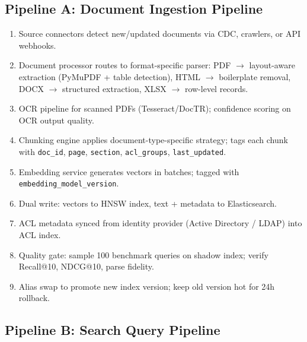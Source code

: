 \subsection*{Pipeline A: Document Ingestion Pipeline}

\begin{enumerate}
  \item Source connectors detect new/updated documents via CDC, crawlers, or API webhooks.
  \item Document processor routes to format-specific parser: PDF $\rightarrow$ layout-aware extraction (PyMuPDF + table detection), HTML $\rightarrow$ boilerplate removal, DOCX $\rightarrow$ structured extraction, XLSX $\rightarrow$ row-level records.
  \item OCR pipeline for scanned PDFs (Tesseract/DocTR); confidence scoring on OCR output quality.
  \item Chunking engine applies document-type-specific strategy; tags each chunk with \texttt{doc\_id}, \texttt{page}, \texttt{section}, \texttt{acl\_groups}, \texttt{last\_updated}.
  \item Embedding service generates vectors in batches; tagged with \texttt{embedding\_model\_version}.
  \item Dual write: vectors to HNSW index, text + metadata to Elasticsearch.
  \item ACL metadata synced from identity provider (Active Directory / LDAP) into ACL index.
  \item Quality gate: sample 100 benchmark queries on shadow index; verify Recall@10, NDCG@10, parse fidelity.
  \item Alias swap to promote new index version; keep old version hot for 24h rollback.
\end{enumerate}

\subsection*{Pipeline B: Search Query Pipeline}

